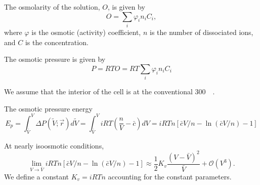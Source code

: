 \documentclass[11pt]{article}
\begin{document}
The osmolarity of the solution, \(O\), is given by
\begin{equation}
    O = \sum_i \varphi_i n_i C_i,
\end{equation}
where \(\varphi\) is the osmotic (activity) coefficient, \(n\) is the number of dissociated ions, and \(C\) is the concentration.

The osmotic pressure is given by
\begin{equation}
    P = RTO  = RT \sum_i  \varphi_i n_i C_i
\end{equation}

We assume that the interior of the cell is at the conventional \SI{300}{\milli\osm}.

The osmotic pressure energy
\begin{equation}
    E_p = \int_{\bar{V}}^{V} \Delta P(\tilde{V}; \vec{r})d \tilde{V} = \int_{\bar{V}}^{V} iRT \left(\frac{n}{V} - \bar{c}\right) dV = iRTn[\bar{c}V/n - \ln(\bar{c}V/n) -1]
\end{equation}

At nearly isoosmotic conditions,
\begin{equation}
    \lim_{V\to\bar{V}} iRTn[\bar{c}V/n - \ln(\bar{c}V/n) -1] \approx \frac{1}{2}K_v \frac{(V - \bar{V})^2}{\bar{V}} + \mathcal{O}(V^3).
\end{equation}
We define a constant \(K_v = iRTn\) accounting for the constant parameters.

\printbibliography
\end{document}
